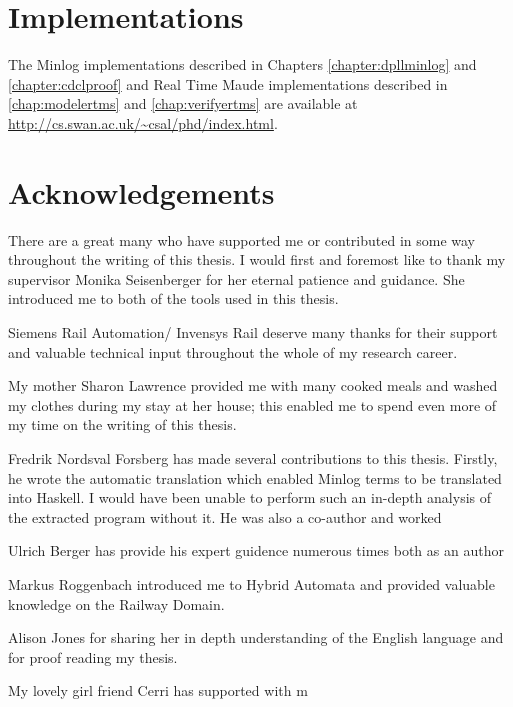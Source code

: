 \section{Implementations}
The Minlog implementations described in Chapters \ref{chapter:dpllminlog} and \ref{chapter:cdclproof} and Real Time Maude implementations described in \ref{chap:modelertms} and \ref{chap:verifyertms} are available at \url{http://cs.swan.ac.uk/~csal/phd/index.html}.

\section{Acknowledgements}
There are a great many who have supported me or contributed in some way throughout the writing of this thesis. I would first and foremost like to thank my supervisor Monika Seisenberger for her eternal patience and guidance. She introduced me to both of the tools used in this thesis.


Siemens Rail Automation/ Invensys Rail deserve many thanks for their support and valuable technical input throughout the whole of my research career.
 

My mother Sharon Lawrence provided me with many cooked meals and washed my clothes during my stay at her house; this enabled me to spend even more of my time on the writing of this thesis.



Fredrik Nordsval Forsberg has made several contributions to this thesis. Firstly, he wrote the automatic translation which enabled Minlog terms to be translated into Haskell.  I would have been unable to perform such an in-depth analysis of the extracted program without it. He was also a co-author and worked 

Ulrich Berger has provide his expert guidence numerous times both as an author

Markus Roggenbach introduced me to Hybrid Automata and provided valuable knowledge on the Railway Domain.

Alison Jones for sharing her in depth understanding of the English language and for proof reading my thesis.






My lovely girl friend Cerri has supported with m

